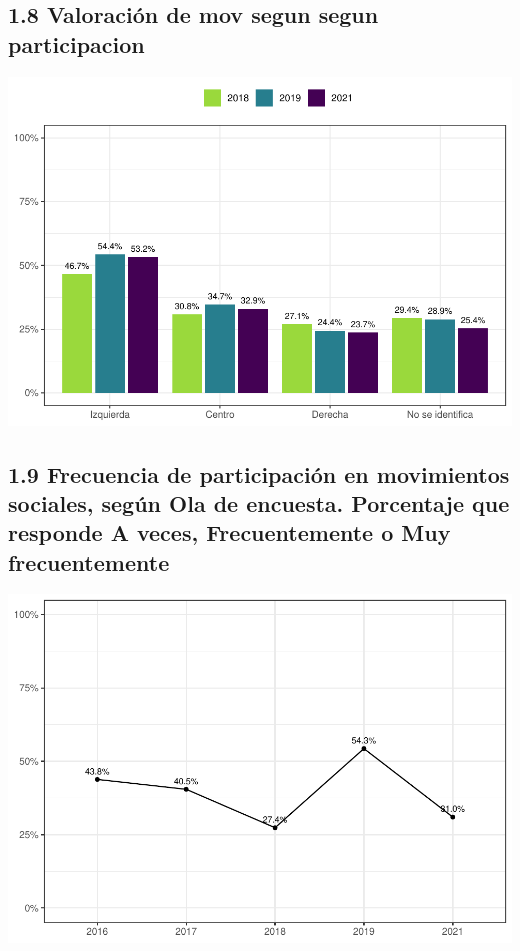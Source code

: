 \documentclass[
  12pt,
  openany]{book}
\begin{document}
\hypertarget{valoraciuxf3n-de-mov-segun-segun-participacion}{%
\subsection{1.8 Valoración de mov segun segun participacion}\label{valoraciuxf3n-de-mov-segun-segun-participacion}}

\includegraphics{reporte-elsoc_files/figure-latex/unnamed-chunk-21-1.pdf}

\hypertarget{frecuencia-de-participaciuxf3n-en-movimientos-sociales-seguxfan-ola-de-encuesta.-porcentaje-que-responde-a-veces-frecuentemente-o-muy-frecuentemente}{%
\subsection{1.9 Frecuencia de participación en movimientos sociales, según Ola de encuesta. Porcentaje que responde A veces, Frecuentemente o Muy frecuentemente}\label{frecuencia-de-participaciuxf3n-en-movimientos-sociales-seguxfan-ola-de-encuesta.-porcentaje-que-responde-a-veces-frecuentemente-o-muy-frecuentemente}}

\includegraphics{reporte-elsoc_files/figure-latex/unnamed-chunk-24-1.pdf}
\end{document}
